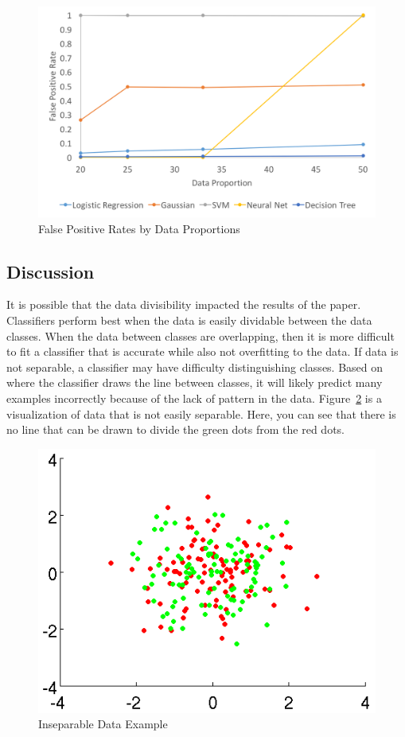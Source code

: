 \documentclass[midd]{thesis}
\begin{document}
\begin{figure} \centering
  \includegraphics[scale=.6]{fpr.png}
  \caption{False Positive Rates by Data Proportions}
  \label{fig:fpr}
\end{figure}




\subsection{Discussion}

It is possible that the data divisibility impacted the results of the paper. Classifiers perform best when the data is easily dividable between the data classes. When the data between classes are overlapping, then it is more difficult to fit a classifier that is accurate while also not overfitting to the data. If data is not separable, a classifier may have difficulty distinguishing classes. Based on where the classifier draws the line between classes, it will likely predict many examples incorrectly because of the lack of pattern in the data. Figure~\ref{fig:inseparable} is a visualization of data that is not easily separable. Here, you can see that there is no line that can be drawn to divide the green dots from the red dots. 

\begin{figure} \centering
  \includegraphics[scale=.6]{inseparable.png}
  \caption{Inseparable Data Example \cite{inseparable}}
  \label{fig:inseparable}
\end{figure}
\end{document}
